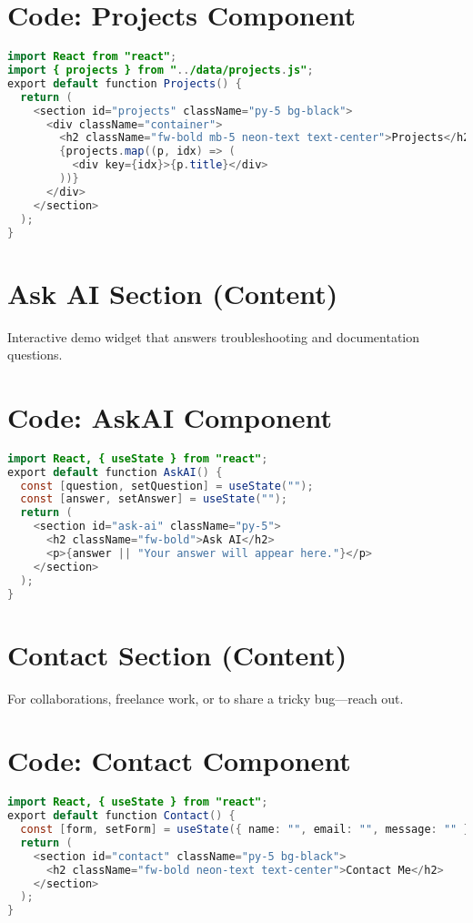 \documentclass[11pt]{article}
\begin{document}
\section*{Code: Projects Component}
\begin{lstlisting}[language=Java]
import React from "react";
import { projects } from "../data/projects.js";
export default function Projects() {
  return (
    <section id="projects" className="py-5 bg-black">
      <div className="container">
        <h2 className="fw-bold mb-5 neon-text text-center">Projects</h2>
        {projects.map((p, idx) => (
          <div key={idx}>{p.title}</div>
        ))}
      </div>
    </section>
  );
}
\end{lstlisting}

\section*{Ask AI Section (Content)}
Interactive demo widget that answers troubleshooting and documentation questions.

\section*{Code: AskAI Component}
\begin{lstlisting}[language=Java]
import React, { useState } from "react";
export default function AskAI() {
  const [question, setQuestion] = useState("");
  const [answer, setAnswer] = useState("");
  return (
    <section id="ask-ai" className="py-5">
      <h2 className="fw-bold">Ask AI</h2>
      <p>{answer || "Your answer will appear here."}</p>
    </section>
  );
}
\end{lstlisting}

\section*{Contact Section (Content)}
For collaborations, freelance work, or to share a tricky bug—reach out.  

\section*{Code: Contact Component}
\begin{lstlisting}[language=Java]
import React, { useState } from "react";
export default function Contact() {
  const [form, setForm] = useState({ name: "", email: "", message: "" });
  return (
    <section id="contact" className="py-5 bg-black">
      <h2 className="fw-bold neon-text text-center">Contact Me</h2>
    </section>
  );
}
\end{lstlisting}
\end{document}

